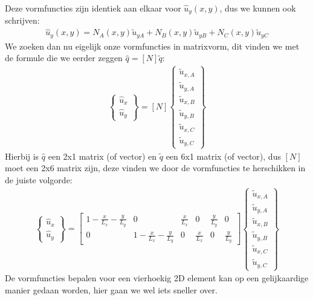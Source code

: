 \documentclass[a4paper,11pt,twoside]{report}
\begin{document}
Deze vormfuncties zijn identiek aan elkaar voor $\hat{u}_y(x,y)$, dus we kunnen ook schrijven:
\begin{align*}
    \hat{u}_y(x,y) = N_A(x,y) \tilde{u}_{yA} + N_B(x,y) \tilde{u}_{yB} + N_C(x,y) \tilde{u}_{yC}
\end{align*}
We zoeken dan nu eigelijk onze vormfuncties in matrixvorm, dit vinden we met de formule die we
eerder zeggen $\hat{q} = [N] \tilde{q}$:
\begin{align*}
    \begin{Bmatrix}
        \hat{u}_x \\
        \hat{u}_y
    \end{Bmatrix} =
    [N]
    \begin{Bmatrix}
        \tilde{u}_{x,A} \\
        \tilde{u}_{y,A} \\
        \tilde{u}_{x,B} \\
        \tilde{u}_{y,B} \\
        \tilde{u}_{x,C} \\
        \tilde{u}_{y,C}
    \end{Bmatrix}
\end{align*}
Hierbij is $\hat{q}$ een 2x1 matrix (of vector) en $\tilde{q}$ een 6x1 matrix (of vector), dus $[N]$
moet een 2x6 matrix zijn, deze vinden we door de vormfuncties te herschikken in de juiste volgorde:
\begin{align*}
    \begin{Bmatrix}
        \hat{u}_x \\
        \hat{u}_y
    \end{Bmatrix} =
    \begin{bmatrix}
        1 - \frac{x}{L_x} - \frac{y}{L_y} & 0                                 & \frac{x}{L_x} & 0             & \frac{y}{L_y} & 0             \\
        0                                 & 1 - \frac{x}{L_x} - \frac{y}{L_y} & 0             & \frac{x}{L_x} & 0             & \frac{y}{L_y}
    \end{bmatrix}
    \begin{Bmatrix}
        \tilde{u}_{x,A} \\
        \tilde{u}_{y,A} \\
        \tilde{u}_{x,B} \\
        \tilde{u}_{y,B} \\
        \tilde{u}_{x,C} \\
        \tilde{u}_{y,C}
    \end{Bmatrix}
\end{align*}
\newpage
De vormfuncties bepalen voor een vierhoekig 2D element kan op een gelijkaardige manier gedaan
worden, hier gaan we wel iets sneller over.
\end{document}
